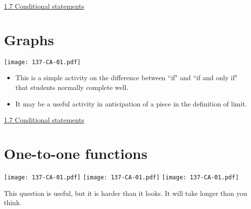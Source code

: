 \documentclass[11pt]{article}
\newcommand{\n}{\newpage}
\newcommand{\nl}{\hfill \vspace{-1.1\baselineskip}} %
\newcommand{\vseven}{\hspace{8mm} \href{https://www.youtube.com/watch?v=VPzlj_OJyU0&list=PLlwePzQY_wW-CPzhk-af-MXj9knthD1gx&index=7}{1.7 Conditional statements}}
\begin{document}
\begin{videos}
\vseven
\end{videos}

\n
\newpage
\section{Graphs} 

\begin{center}
{ \texttt{[image: 137-CA-01.pdf]}}
\end{center}

\begin{comments}
\nl
	\begin{itemize}
		\item  This is a simple activity on the difference between ``if" and ``if and only if" that students normally complete well.
		\item  It may be a useful activity in anticipation of a piece in the definition of limit.
	\end{itemize}
\end{comments}

\begin{videos}
\vseven
\end{videos}

\n
\newpage
\section{One-to-one functions} 

\begin{center}
{ \texttt{[image: 137-CA-01.pdf]}}
\quad
{ \texttt{[image: 137-CA-01.pdf]}}
{ \texttt{[image: 137-CA-01.pdf]}}
\end{center}

\begin{warning}
This question is useful, but it is harder than it looks.  It will take longer than you think.
\end{warning}
\end{document}

